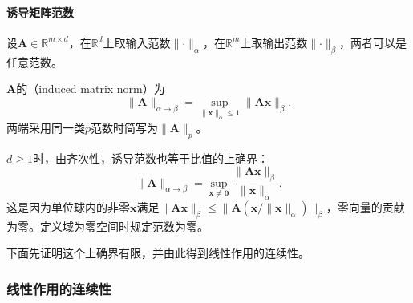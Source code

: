 \paragraph{诱导矩阵范数}
设$\bm A\in\mathbb R^{m\times d}$，在$\mathbb R^d$上取输入范数$\lVert\cdot\rVert_\alpha$，在$\mathbb R^m$上取输出范数$\lVert\cdot\rVert_\beta$，两者可以是任意范数。
\begin{definition}[由向量范数诱导的矩阵范数]
\label{def:matrix-analysis-induced-norm}
$\bm A$的（induced matrix norm）为
\begin{equation}
 \lVert\bm A\rVert_{\alpha\to\beta}
 =\sup_{\lVert\bm x\rVert_\alpha\leq1}\lVert\bm A\bm x\rVert_\beta .
 \label{eq:ls-induced-matrix-norm}
\end{equation}
两端采用同一类$p$范数时简写为$\lVert\bm A\rVert_p$。
\end{definition}
$d\geq1$时，由齐次性，诱导范数也等于比值的上确界：
\[
 \lVert\bm A\rVert_{\alpha\to\beta}=\sup_{\bm x\neq\bm0}\frac{\lVert\bm A\bm x\rVert_\beta}{\lVert\bm x\rVert_\alpha}.
\]
这是因为单位球内的非零$\bm x$满足$\lVert\bm A\bm x\rVert_\beta\leq\lVert\bm A(\bm x/\lVert\bm x\rVert_\alpha)\rVert_\beta$，零向量的贡献为零。定义域为零空间时规定范数为零。

下面先证明这个上确界有限，并由此得到线性作用的连续性。

\subsubsection{线性作用的连续性}
\label{sec:ls-linear-action-continuity}

